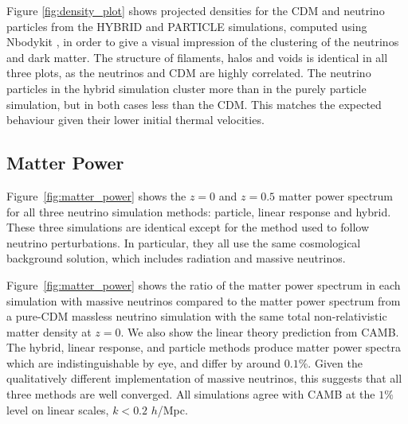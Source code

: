 \documentclass[useAMS, usenatbib]{mnras}
\begin{document}
Figure \ref{fig:density_plot} shows projected densities for the CDM and neutrino particles from the HYBRID and PARTICLE simulations, computed using Nbodykit \citep{Hand_2017}, in order to give a visual impression of the clustering of the neutrinos and dark matter. The structure of filaments, halos and voids is identical in all three plots, as the neutrinos and CDM are highly correlated. The neutrino particles in the hybrid simulation cluster more than in the purely particle simulation, but in both cases less than the CDM. This matches the expected behaviour given their lower initial thermal velocities.

\subsection{Matter Power}
\label{sec:matterpower}

Figure~\ref{fig:matter_power} shows the $z=0$ and $z=0.5$ matter power spectrum for all three neutrino simulation methods: particle, linear response and hybrid. These three simulations are identical except for the method used to follow neutrino perturbations. In particular, they all use the same cosmological background solution, which includes radiation and massive neutrinos.

Figure~\ref{fig:matter_power} shows the ratio of the matter power spectrum in each simulation with massive neutrinos compared to the matter power spectrum from a pure-CDM massless neutrino simulation with the same total non-relativistic matter density at $z = 0$. We also show the linear theory prediction from CAMB. The hybrid, linear response, and particle methods produce matter power spectra which are indistinguishable by eye, and differ by around $0.1\%$. Given the qualitatively different implementation of massive neutrinos, this suggests that all three methods are well converged. All simulations agree with CAMB at the $1\%$ level on linear scales, $k < 0.2$ $h$/Mpc.
\end{document}
